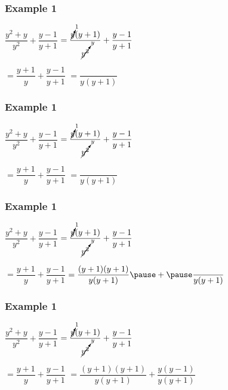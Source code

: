 \documentclass[14pt]{beamer}
\begin{document}
    \begin{frame}
    	\frametitle{Example 1}
    	$\dfrac{y^2+y}{y^2} + \dfrac{y-1}{y+1}$
    	$ = \dfrac{\cancelto{1}{y} (y + 1) }{\cancelto{y}{y^2}} + \dfrac{y-1}{y+1}$
    	
    	\vspace{1em}\hspace{1em} $ = \dfrac{y+1}{y} + \dfrac{y-1}{y+1} $
    	$ = \dfrac{}{y(y+1)} $
    	
    \end{frame}

    \begin{frame}
    	\frametitle{Example 1}
    	$\dfrac{y^2+y}{y^2} + \dfrac{y-1}{y+1}$
    	$ = \dfrac{\cancelto{1}{y} (y + 1) }{\cancelto{y}{y^2}} + \dfrac{y-1}{y+1}$
    	
    	\vspace{1em}\hspace{1em} $ = \dfrac{y+1}{y} + \dfrac{y-1}{y+1} $
    	$ = \dfrac{}{y(y+1)} $
    	
    \end{frame}

    \begin{frame}
    	\frametitle{Example 1}
    	$\dfrac{y^2+y}{y^2} + \dfrac{y-1}{y+1}$
    	$ = \dfrac{\cancelto{1}{y} (y + 1) }{\cancelto{y}{y^2}} + \dfrac{y-1}{y+1}$
    	
    	\vspace{1em}\hspace{1em} $ = \dfrac{y+1}{y} + \dfrac{y-1}{y+1} $
    	$ = \dfrac{(y+1) (y+1)}{y(y+1)} \pause + \pause \dfrac{}{y (y + 1)}$
    	
    	\pause {}
    \end{frame}

    \begin{frame}
    	\frametitle{Example 1}
    	$\dfrac{y^2+y}{y^2} + \dfrac{y-1}{y+1}$
    	$ = \dfrac{\cancelto{1}{y} (y + 1) }{\cancelto{y}{y^2}} + \dfrac{y-1}{y+1}$
    	
    	\vspace{1em}\hspace{1em} $ = \dfrac{y+1}{y} + \dfrac{y-1}{y+1} $
    	$ = \dfrac{(y+1) (y+1)}{y(y+1)} + \dfrac{y (y - 1)}{y (y + 1)}$
    \end{frame}
\end{document}
